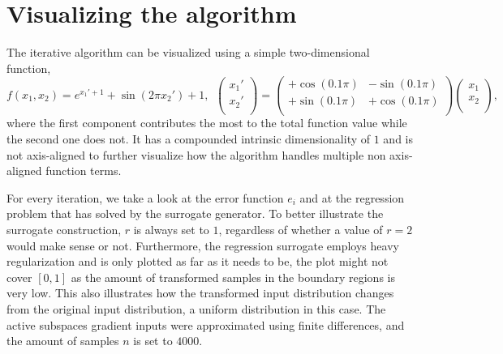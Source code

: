 \documentclass[
  a4paper,  %
  twoside,  %
  bibliography=totoc,
  headsepline,
  cleardoublepage=empty,
  parskip=half,
  draft=false
]{scrbook}
\begin{document}
\section{Visualizing the algorithm}

The iterative algorithm can be visualized using a simple two-dimensional function,
\begin{equation}
f(x_1, x_2)=e^{x_1' + 1} + \sin(2 \pi x_2') + 1, ~~ \begin{pmatrix}
    x_1' \\ x_2'
    \\
  \end{pmatrix} = \begin{pmatrix}
    +\cos(0.1 \pi) & -\sin(0.1 \pi)\\
    +\sin(0.1 \pi) & +\cos(0.1 \pi)
    \\
  \end{pmatrix}\begin{pmatrix}
    x_1 \\ x_2
    \\
  \end{pmatrix},
\end{equation}
where the first component contributes the most to the total function value while the second one does not.
It has a compounded intrinsic dimensionality of $1$ and is not axis-aligned to further visualize how the algorithm handles multiple non axis-aligned function terms.

For every iteration, we take a look at the error function $e_i$ and at the regression problem that has solved by the surrogate generator.
To better illustrate the surrogate construction, $r$ is always set to $1$, regardless of whether a value of $r=2$ would make sense or not.
Furthermore, the regression surrogate employs heavy regularization and is only plotted as far as it needs to be, \ie the plot might not cover $[0,1]$ as the amount of transformed samples in the boundary regions is very low.
This also illustrates how the transformed input distribution changes from the original input distribution, a uniform distribution in this case.
The active subspaces gradient inputs were approximated using finite differences, and the amount of samples $n$ is set to $4000$.

\newpage
\end{document}
